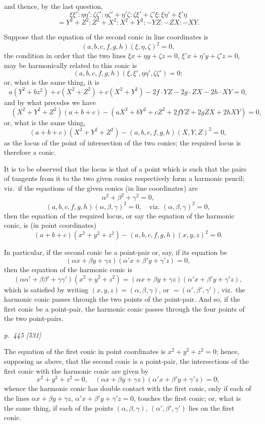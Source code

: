 \documentclass[11pt,a4paper]{book}
\begin{document}
and thence, by the last question,
\[
\xi\xi' : \eta\eta' : \zeta\zeta' : \eta\zeta' + \eta'\zeta : \zeta\xi' + \zeta'\xi : \xi\eta' + \xi'\eta
\]
\[
= Y^2 + Z^2 : Z^2 + X^2 : X^2 + Y^2 : -YZ : -ZX : -XY.
\]

Suppose that the equation of the second conic in line coordinates is
\[
(a, b, c, f, g, h)(\xi, \eta, \zeta)^2 = 0,
\]
the condition in order that the two lines $\xi x + \eta y + \zeta z = 0$, $\xi' x + \eta' y + \zeta' z = 0$, may be
harmonically related to this conic is
\[
(a, b, c, f, g, h)(\xi, \xi', \eta\eta', \zeta\zeta') = 0;
\]
or, what is the same thing, it is
\[
a(Y^2 + bz^2) + c(X^2 + Z^2) + c(X^2 + Y^2) - 2f \cdot YZ - 2g \cdot ZX - 2h \cdot XY = 0,
\]
and by what precedes we have
\[
\quad (X^2 + Y^2 + Z^2)(a + b + c) - (aX^2 + bY^2 + cZ^2 + 2fYZ + 2gZX + 2hXY) = 0,
\]
or, what is the same thing,
\[
(a + b + c)(X^2 + Y^2 + Z^2) - (a, b, c, f, g, h)(X, Y, Z)^2 = 0,
\]
as the locus of the point of intersection of the two conics; the required locus is therefore a conic.

It is to be observed that the locus is that of a point which is such that the
pairs of tangents from it to the two given conics respectively form a harmonic pencil;
viz.\ if the equations of the given conics (in line coordinates) are
\[
\alpha^2 + \beta^2 + \gamma^2 = 0,
\]
\[
(a, b, c, f, g, h)(\alpha, \beta, \gamma)^2 = 0, \quad \text{viz.\ } (\alpha, \beta, \gamma)^2 = 0,
\]
then the equation of the required locus, or say the equation of the harmonic conic, is
(in point coordinates)
\[
(a + b + c)(x^2 + y^2 + z^2) - (a, b, c, f, g, h)(x, y, z)^2 = 0.
\]

In particular, if the second conic be a point-pair or, say, if its equation be
\[
(\alpha x + \beta y + \gamma z)(\alpha' x + \beta' y + \gamma' z) = 0,
\]
then the equation of the harmonic conic is
\[
(\alpha\alpha' + \beta\beta' + \gamma\gamma')(x^2 + y^2 + z^2) = (\alpha x + \beta y + \gamma z)(\alpha' x + \beta' y + \gamma' z),
\]
which is satisfied by writing $(x, y, z) = (\alpha, \beta, \gamma)$, or $= (\alpha', \beta', \gamma')$, viz.\ the harmonic
conic passes through the two points of the point-pair. And so, if the first conic be
a point-pair, the harmonic conic passes through the four points of the two point-pairs.

\clearpage

\bigskip
\textit{p.~445 [531]}
\smallskip

The equation of the first conic in point coordinates is $x^2 + y^2 + z^2 = 0$; hence,
supposing as above, that the second conic is a point-pair, the intersections of the first
conic with the harmonic conic are given by
\[
x^2 + y^2 + z^2 = 0, \quad (\alpha x + \beta y + \gamma z)(\alpha' x + \beta' y + \gamma' z) = 0;
\]
whence the harmonic conic has double contact with the first conic, only if each of
the lines $\alpha x + \beta y + \gamma z$, $\alpha' x + \beta' y + \gamma' z = 0$, touches the first conic; or, what is the same
thing, if each of the points $(\alpha, \beta, \gamma)$, $(\alpha', \beta', \gamma')$ lies on the first conic.
\end{document}

